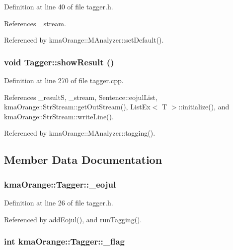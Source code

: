 Definition at line 40 of file tagger.h.

References \_\-stream.

Referenced by kmaOrange::MAnalyzer::setDefault().\hypertarget{classkmaOrange_1_1Tagger_774d2a378a7f3e7b649d261207e633cb}{
\subsubsection[{showResult}]{\setlength{\rightskip}{0pt plus 5cm}void Tagger::showResult ()}}
\label{classkmaOrange_1_1Tagger_774d2a378a7f3e7b649d261207e633cb}




Definition at line 270 of file tagger.cpp.

References \_\-resultS, \_\-stream, Sentence::eojulList, kmaOrange::StrStream::getOutStream(), ListEx$<$ T $>$::initialize(), and kmaOrange::StrStream::writeLine().

Referenced by kmaOrange::MAnalyzer::tagging().

\subsection{Member Data Documentation}
\hypertarget{classkmaOrange_1_1Tagger_53a6531fff482ea3378a68890d8d7ecf}{
\subsubsection[{\_\-eojul}]{ {\bf kmaOrange::Tagger::\_\-eojul}}}
\label{classkmaOrange_1_1Tagger_53a6531fff482ea3378a68890d8d7ecf}




Definition at line 26 of file tagger.h.

Referenced by addEojul(), and runTagging().\hypertarget{classkmaOrange_1_1Tagger_d6157a27601a393b3348d88ed6368a7b}{
\subsubsection[{\_\-flag}]{\setlength{\rightskip}{0pt plus 5cm}int {\bf kmaOrange::Tagger::\_\-flag}}}
\label{classkmaOrange_1_1Tagger_d6157a27601a393b3348d88ed6368a7b}




